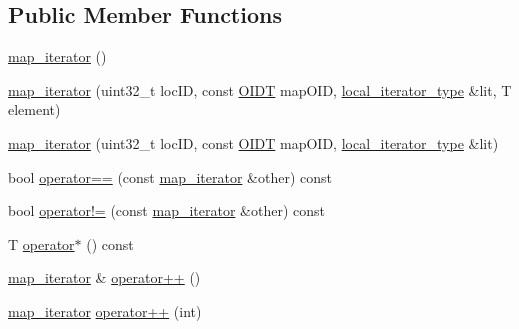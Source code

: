 \subsection*{Public Member Functions}
\begin{DoxyCompactItemize}
\item 
\hyperlink{classshad_1_1map__iterator_a085dcb1354b6b6b7326c69efd3c228e6}{map\-\_\-iterator} ()
\item 
\hyperlink{classshad_1_1map__iterator_ac93f17a66ee8c0569d5700134b263f39}{map\-\_\-iterator} (uint32\-\_\-t loc\-I\-D, const \hyperlink{classshad_1_1map__iterator_aecdaced930b9dcb48d5eff9ef992fbd5}{O\-I\-D\-T} map\-O\-I\-D, \hyperlink{classshad_1_1map__iterator_adceb72a3948aa860edd3a4c9ceca821d}{local\-\_\-iterator\-\_\-type} \&lit, T element)
\item 
\hyperlink{classshad_1_1map__iterator_aac7de0f8d21acd08be67f02aec45f3d3}{map\-\_\-iterator} (uint32\-\_\-t loc\-I\-D, const \hyperlink{classshad_1_1map__iterator_aecdaced930b9dcb48d5eff9ef992fbd5}{O\-I\-D\-T} map\-O\-I\-D, \hyperlink{classshad_1_1map__iterator_adceb72a3948aa860edd3a4c9ceca821d}{local\-\_\-iterator\-\_\-type} \&lit)
\item 
bool \hyperlink{classshad_1_1map__iterator_a84b9e374f5420dbf1c3c6e22e7a0958f}{operator==} (const \hyperlink{classshad_1_1map__iterator}{map\-\_\-iterator} \&other) const 
\item 
bool \hyperlink{classshad_1_1map__iterator_af3bf9fb8d3abca27b66e7cfd192e34cd}{operator!=} (const \hyperlink{classshad_1_1map__iterator}{map\-\_\-iterator} \&other) const 
\item 
T \hyperlink{classshad_1_1map__iterator_a783e686ed5416838221177430bf136ce}{operator$\ast$} () const 
\item 
\hyperlink{classshad_1_1map__iterator}{map\-\_\-iterator} \& \hyperlink{classshad_1_1map__iterator_ad8d506efca132c4219e7e011230387b5}{operator++} ()
\item 
\hyperlink{classshad_1_1map__iterator}{map\-\_\-iterator} \hyperlink{classshad_1_1map__iterator_af899decfb38395fc586a6eb4bfe8f8f9}{operator++} (int)
\end{DoxyCompactItemize}
